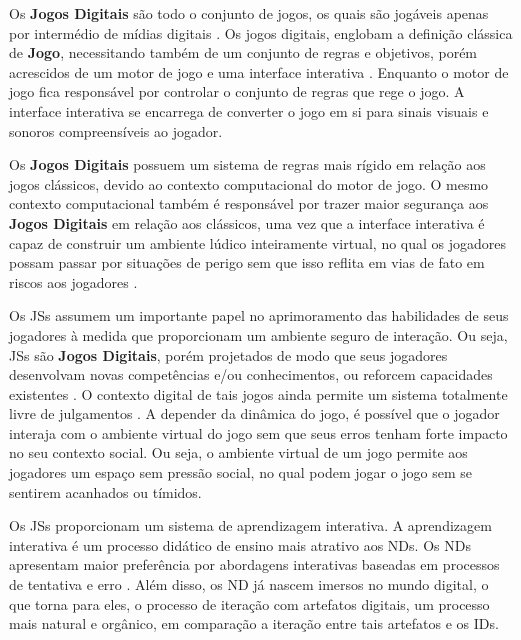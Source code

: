 Os \textbf{Jogos Digitais} são todo o conjunto de jogos, os quais são jogáveis apenas por intermédio de mídias digitais \cite{lucchese2009conceituaccao}. Os jogos digitais, englobam a definição clássica de \textbf{Jogo}, necessitando também de um conjunto de regras e objetivos, porém acrescidos de um motor de jogo e uma interface interativa \cite{battaiola2000jogos}. Enquanto o motor de jogo fica responsável por controlar o conjunto de regras que rege o jogo. A interface interativa se encarrega de converter o jogo em si para sinais visuais e sonoros compreensíveis ao jogador.

Os \textbf{Jogos Digitais}  possuem um sistema de regras mais rígido em relação aos jogos clássicos, devido ao contexto computacional do motor de jogo. O mesmo contexto computacional também é responsável por trazer maior segurança aos \textbf{Jogos Digitais}  em relação aos clássicos, uma vez que a interface interativa é capaz de construir um ambiente lúdico inteiramente virtual, no qual os jogadores possam passar por situações de perigo sem que isso reflita em vias de fato em riscos aos jogadores \cite{lucchese2009conceituaccao}.

Os \acp{JS} assumem um importante papel no aprimoramento das habilidades de seus jogadores à medida que proporcionam um ambiente seguro de interação. Ou seja, \acp{JS} são \textbf{Jogos Digitais}, porém projetados de modo que seus jogadores desenvolvam novas competências e/ou conhecimentos, ou reforcem capacidades existentes \cite{boller2017play}. O contexto digital de tais jogos ainda permite um sistema totalmente livre de julgamentos \cite{unesco2018international}. A depender da dinâmica do jogo, é possível que o jogador interaja com o ambiente virtual do jogo sem que seus erros tenham forte impacto no seu contexto social. Ou seja, o ambiente virtual de um jogo permite aos jogadores um espaço sem pressão social, no qual podem jogar o jogo sem se sentirem acanhados ou tímidos.

Os \acp{JS} proporcionam um sistema de aprendizagem interativa. A aprendizagem interativa é um processo didático de ensino mais atrativo aos \acfp{ND}. Os \acp{ND} apresentam maior preferência por abordagens interativas baseadas em processos de tentativa e erro \cite{pescador2010tecnologias}. Além disso, os \ac{ND} já nascem imersos no mundo digital, o que torna para eles, o processo de iteração com artefatos digitais, um processo mais natural e orgânico, em comparação a iteração entre tais artefatos e os \acfp{ID}.

